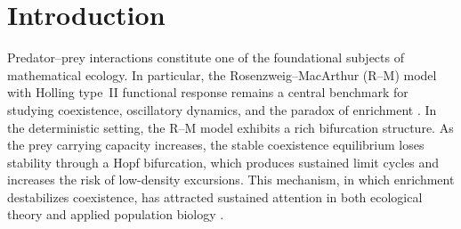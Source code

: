 \documentclass[pdflatex,sn-mathphys-ay]{sn-jnl}
\theoremstyle{thmstyleone}
\theoremstyle{definition}
\theoremstyle{remark}
\begin{document}
\maketitle

\section{Introduction}
\label{sec:introduction_paperA}

Predator--prey interactions constitute one of the foundational subjects of mathematical ecology. In particular, the Rosenzweig--MacArthur (R--M) model with Holling type~II functional response remains a central benchmark for studying coexistence, oscillatory dynamics, and the paradox of enrichment \citep{rosenzweig_graphical_1963,rosenzweig_paradox_1971,may_stability_2001,beay_stability_2019}. 
In the deterministic setting, the R--M model exhibits a rich bifurcation structure. As the prey carrying capacity increases, the stable coexistence equilibrium loses stability through a Hopf bifurcation, which produces sustained limit cycles and increases the risk of low-density excursions. 
This mechanism, in which enrichment destabilizes coexistence, has attracted sustained attention in both ecological theory and applied population biology \citep{gilpin_enriched_1972,arditi_coupling_1989,roy_stability_2007}.
\end{document}
